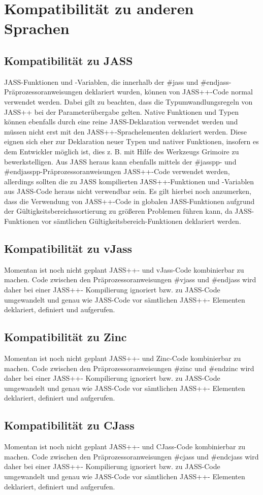 \chapter{Kompatibilität zu anderen Sprachen}

\section{Kompatibilität zu JASS}
JASS-Funktionen und -Variablen, die innerhalb der #jass und #endjass-Präprozessoranweisungen
deklariert wurden, können von JASS++-Code normal verwendet werden. Dabei gilt zu beachten,
dass die Typumwandlungsregeln von JASS++ bei der Parameterübergabe gelten.
Native Funktionen und Typen können ebenfalls durch eine reine JASS-Deklaration verwendet werden
und müssen nicht erst mit den JASS++-Sprachelementen deklariert werden. Diese eignen sich eher
zur Deklaration neuer Typen und nativer Funktionen, insofern es dem Entwickler möglich ist, dies
z. B. mit Hilfe des Werkzeugs Grimoire zu bewerkstelligen.
Aus JASS heraus kann ebenfalls mittels der #jasspp- und #endjasspp-Präprozessoranweisungen JASS++-Code
verwendet werden, allerdings sollten die zu JASS kompilierten JASS++-Funktionen und -Variablen
aus JASS-Code heraus nicht verwendbar sein.
Es gilt hierbei noch anzumerken, dass die Verwendung von JASS++-Code in globalen JASS-Funktionen
aufgrund der Gültigkeitsbereichssortierung zu größeren Problemen führen kann, da JASS-Funktionen vor sämtlichen
Gültigkeitsbereich-Funktionen deklariert werden.

\section{Kompatibilität zu vJass}
Momentan ist noch nicht geplant JASS++- und vJass-Code kombinierbar zu machen.
Code zwischen den Präprozessoranweisungen #vjass und #endjass wird daher bei einer JASS++-
Kompilierung ignoriert bzw. zu JASS-Code umgewandelt und genau wie JASS-Code vor sämtlichen JASS++-
Elementen deklariert, definiert und aufgerufen.

\section{Kompatibilität zu Zinc}
Momentan ist noch nicht geplant JASS++- und Zinc-Code kombinierbar zu machen.
Code zwischen den Präprozessoranweisungen #zinc und #endzinc wird daher bei einer JASS++-
Kompilierung ignoriert bzw. zu JASS-Code umgewandelt und genau wie JASS-Code vor sämtlichen JASS++-
Elementen deklariert, definiert und aufgerufen.

\section{Kompatibilität zu CJass}
Momentan ist noch nicht geplant JASS++- und CJass-Code kombinierbar zu machen.
Code zwischen den Präprozessoranweisungen #cjass und #endcjass wird daher bei einer JASS++-
Kompilierung ignoriert bzw. zu JASS-Code umgewandelt und genau wie JASS-Code vor sämtlichen JASS++-
Elementen deklariert, definiert und aufgerufen.